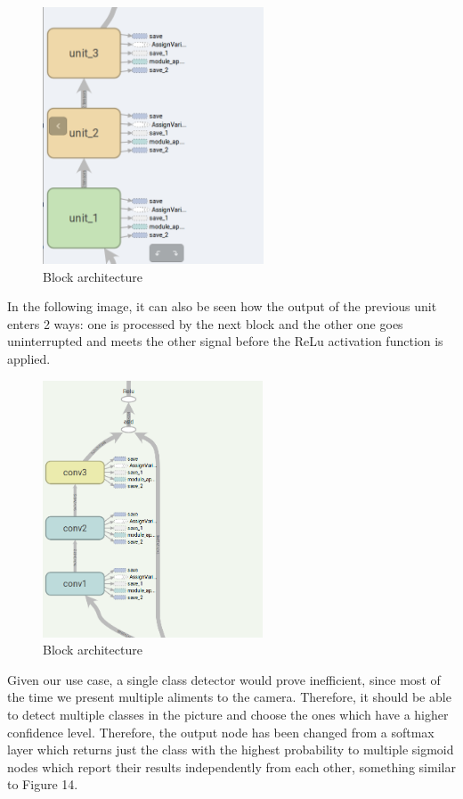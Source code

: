 \documentclass[a4paper,11pt]{article}
\begin{document}
		
		\begin{figure}[H]
			\includegraphics[height=3in]{blockarchitecture.png}
			\caption{Block architecture}
		\end{figure}
	
	In the following image, it can also be seen how the output of the previous unit enters 2 ways: one is processed by the next block and the other one goes uninterrupted and meets the other signal before the ReLu activation function is applied.

	\begin{figure}[H]
		\includegraphics[height=3in]{resnetunit.png}
		\caption{Block architecture}
	\end{figure}

	  Given our use case, a single class detector would prove inefficient, since most of the time we present multiple aliments to the camera. Therefore, it should be able to detect multiple classes in the picture and choose the ones which have a higher confidence level. Therefore, the output node has been changed from a softmax layer which returns just the class with the highest probability to multiple sigmoid nodes which report their results independently from each other, something similar to Figure 14.
	  \newline
	  
\end{document}
